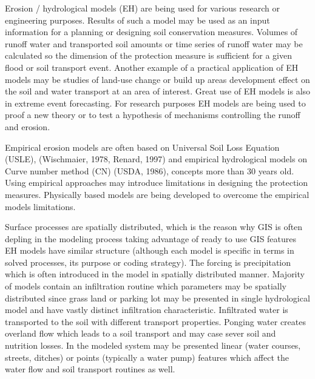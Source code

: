 Erosion / hydrological models (EH) are being used for various research or engineering purposes. Results of such a model may be used as an input information for a planning or designing soil conservation measures. Volumes of runoff water and transported soil amounts or time series of runoff water may be calculated so the dimension of the protection measure is sufficient for a given flood or soil transport event. Another example of a practical application of EH models may be studies of land-use change or build up areas development effect on the soil and water transport at an area of interest. Great use of EH models is also in extreme event forecasting. For research purposes EH models are being used to proof a new theory or to test a hypothesis of mechanisms controlling the runoff and erosion.

Empirical erosion models are often based on Universal Soil Loss Equation (USLE), (Wischmaier, 1978, Renard, 1997) and empirical hydrological models on Curve number method (CN) (USDA, 1986), concepts more than 30 years old. Using empirical approaches may introduce limitations in designing the protection measures. Physically based models are being developed to overcome the empirical models limitations. 

Surface processes are spatially distributed, which is the reason why GIS is often depling in the modeling process taking advantage of ready to use GIS features EH models have similar structure (although each model is specific in terms in solved processes, its purpose or coding strategy). The forcing is precipitation which is often introduced in the model in spatially distributed manner. Majority of models contain an infiltration routine which parameters may be spatially distributed since grass land or parking lot may be presented in single hydrological model and have vastly distinct infiltration characteristic. Infiltrated water is transported to the soil with different transport properties. Ponging water creates overland flow which leads to a soil transport and may case sever soil and nutrition losses. In the modeled system may be presented linear (water courses, streets, ditches) or points (typically a water pump) features which affect the water flow and soil transport routines as well. 


